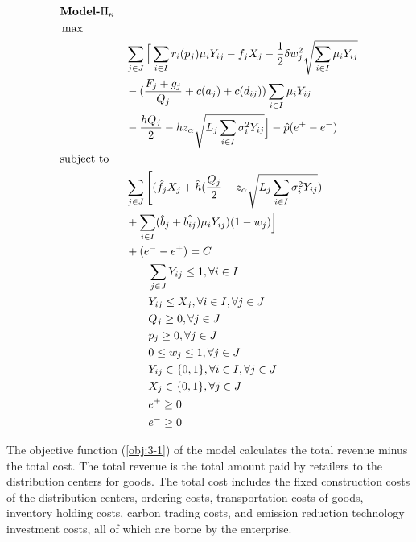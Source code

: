 \documentclass[]{article}
\theoremstyle{plain}%
\theoremstyle{definition}
\theoremstyle{remark}
\theoremstyle{plain}%
\begin{document}
    \begin{align}
    & \textbf{Model-} \Pi_\kappa & & \notag\\
    & \max        & & \notag\\
    & & &\sum_{j\in J} \Big[ \sum_{i\in I}r_i(p_j)\mu_iY_{ij}-f_jX_j-\frac{1}{2}\delta w^2_j \sqrt{\sum_{i\in I}\mu_iY_{ij}}\notag  \\
    & & &-(\frac{F_j+g_j}{Q_j}+c(a_j)+c(d_{ij}))\sum_{i\in I}\mu_iY_{ij} \notag  \\
    & & &-\frac{hQ_j}{2}-hz_{\alpha} \sqrt{L_j\sum_{i\in I}\sigma^2_iY_{ij}} \Big]-\hat{p}(e^+-e^-) \label{obj:3-1}\\
    & \mbox{subject to} && \notag  \\
    & & & \sum_{j\in J}\Bigg[(\hat{f}_jX_j+\hat{h}(\frac{Q_j}{2}+z_{\alpha}\sqrt{L_j\sum_{i\in I}\sigma^2_iY_{ij}}) \notag  \\
    & & &+\sum_{i\in I}(\hat{b}_j+\hat{b_{ij}})\mu_iY_{ij})(1-w_j)\Big] \notag \\
    & & &+(e^--e^+)=C  \label{cons:3-1}\\
    & & &\quad\quad \sum_{j\in J}Y_{ij} \leq 1, \forall{i\in I} \label{cons:3-2}\\
    & & &\quad\quad Y_{ij} \leq X_j ,  \forall{i\in I}, \forall{j\in J} \label{cons:3-3}\\
    & & &\quad\quad Q_j \geq 0, \forall{j\in J} \label{cons:3-4}\\
    & & &\quad\quad p_j \geq 0, \forall{j\in J} \label{cons:3-5}\\
    & & &\quad\quad 0 \leq w_j \leq 1, \forall{j\in J} \label{cons:3-6}\\
    & & &\quad\quad Y_{ij} \in \{0,1\} ,  \forall{i\in I}, \forall{j\in J} \label{cons:3-7}\\
    & & &\quad\quad X_{j} \in \{0,1\} ,  \forall{j\in J} \label{cons:3-8}\\
    & & &\quad\quad e^+ \geq 0 \label{cons:3-9}\\
    & & &\quad\quad e^- \geq 0 \label{cons:3-10}
    \end{align}
    
    The objective function (\ref{obj:3-1}) of the model calculates the total revenue minus the total cost. The total revenue is the total amount paid by retailers to the distribution centers for goods. The total cost includes the fixed construction costs of the distribution centers, ordering costs, transportation costs of goods, inventory holding costs, carbon trading costs, and emission reduction technology investment costs, all of which are borne by the enterprise.
\end{document}
